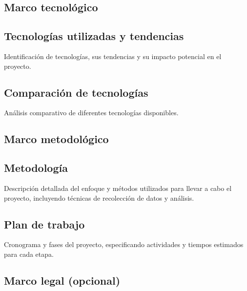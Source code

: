 \documentclass[12pt,letterpaper]{report}
\begin{document}
	\newpage
	\begin{center}
	\section{Marco tecnológico}
	\end{center}
	
	\subsection{Tecnologías utilizadas y tendencias}
	Identificación de tecnologías, sus tendencias y su impacto potencial en el proyecto.
	
	\subsection{Comparación de tecnologías}
	Análisis comparativo de diferentes tecnologías disponibles.
	
	\newpage
	\begin{center}
	\section{Marco metodológico}
	\end{center}
	
	\subsection{Metodología}
	Descripción detallada del enfoque y métodos utilizados para llevar a cabo el proyecto, incluyendo técnicas de recolección de datos y análisis.
	
	\subsection{Plan de trabajo}
	Cronograma y fases del proyecto, especificando actividades y tiempos estimados para cada etapa.
	
	\newpage
	\begin{center}
	\section{Marco legal (opcional)}
	\end{center}
	
\end{document}
